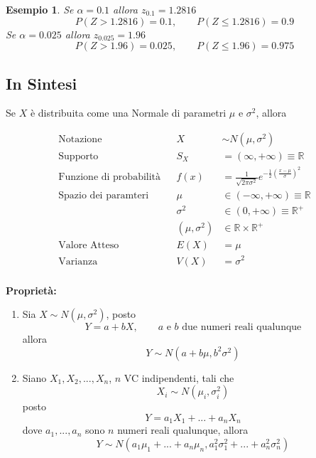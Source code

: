 \documentclass[
  11pt,
]{book}
\providecommand{\tightlist}{%
  \setlength{\itemsep}{0pt}\setlength{\parskip}{0pt}}
\theoremstyle{mytheoremstyle}
\theoremstyle{mydefstyle}
\newtheorem{example}{{Esempio}}[section]
\begin{document}
\begin{example}
Se \(\alpha=0.1\) allora \(z_{0.1}=1.2816\)
\[P(Z>1.2816)=0.1,\qquad P(Z\leq 1.2816)=0.9\]
Se \(\alpha=0.025\) allora \(z_{0.025}=1.96\)
\[P(Z>1.96)=0.025,\qquad P(Z\leq 1.96)=0.975\]
\end{example}

\clearpage

\subsection{In Sintesi}\label{in-sintesi-3}

\begin{info2}

Se \(X\) è distribuita come una Normale di parametri \(\mu\) e \(\sigma^2\), allora

\begin{align*}
\text{Notazione} & & X&\sim N(\mu,\sigma^2) \\
\text{Supporto} & & S_X &=(\infty,+\infty)\equiv\mathbb{R} \\
\text{Funzione di probabilità} & & f(x)&=\frac{1}{\sqrt{2\pi\sigma^2}}e^{-\frac 12 \left(\frac{x-\mu}{\sigma}\right)^2}\\
\text{Spazio dei paramteri} & & \mu&\in(-\infty,+\infty)\equiv\mathbb{R}\\
                            & & \sigma^2&\in(0,+\infty)\equiv\mathbb{R}^+\\
                            & & (\mu,\sigma^2)&\in\mathbb{R}\times\mathbb{R}^+\\
\text{Valore Atteso} & & E(X)&=\mu\\
\text{Varianza} & & V(X)&=\sigma^2\\
\end{align*}

\textbf{Proprietà:}

\begin{enumerate}
\def\labelenumi{\arabic{enumi}.}
\tightlist
\item
  Sia \(X\sim N(\mu,\sigma^2)\), posto
  \[Y=a+bX,\qquad\text{$a$ e $b$ due numeri reali qualunque}\]
  allora
  \[Y\sim N(a+b\mu,b^2\sigma^2)\]
\item
  Siano \(X_1, X_2,...,X_n\), \(n\) VC indipendenti, tali che
  \[X_i\sim N(\mu_i,\sigma_i^2)\]
  posto
  \[Y=a_1X_1+...+a_nX_n\]
  dove \(a_1,...,a_n\) sono \(n\) numeri reali qualunque, allora
  \[Y\sim N(a_1\mu_1+...+a_n\mu_n,a_1^2\sigma_1^2+...+a_n^2\sigma_n^2)\]
\end{enumerate}

\end{info2}
\end{document}
